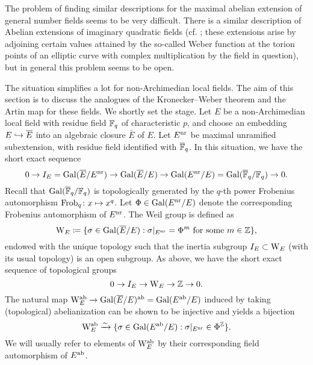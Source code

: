 \documentclass[../main.tex]{subfiles}
\begin{document}
The problem of finding similar descriptions for the maximal abelian extension of
general number fields seems to be very difficult. There is a similar description 
of Abelian extensions of imaginary quadratic fields (cf. \cite[Chapter II,
§5]{silverman1994advanced}; these extensions arise by adjoining certain values attained
by the so-called Weber function at the torion points of an elliptic curve with complex
multiplication by the field in question), but in general this problem seems to be open.

The situation simplifies a lot for non-Archimedian local fields. 
The aim of this section is to discuss the analogues of the 
Kronecker--Weber theorem and the Artin map for these fields. We shortly set the
stage. Let $E$ be a non-Archimedian local field with residue field $\mathbb{F}_q$ of
characteristic $p$, and choose an embedding $E \hookrightarrow \overline E$ into an algebraic
closure $\bar E$ of $E$. Let $E^{\mathrm{nr}}$ be maximal unramified subextension, with
residue field identified with ${\overline {\mathbb{F}}_q}$.
In this situation, we have the short exact sequence
\begin{equation*}
  0 \to I_E = \operatorname{Gal}(\overline E/ E^{\mathrm{nr}}) \to \operatorname{Gal}(\overline E/E) \to \operatorname{Gal}(E^{\mathrm{nr}} /E) =
  \operatorname{Gal}(\overline {\mathbb{F}}_q /\mathbb{F}_q) \to 0.
\end{equation*}
Recall that $\operatorname{Gal}({\overline {\mathbb{F}}_q}/\mathbb{F}_q)$ is topologically generated by the $q$-th power
Frobenius automorphism $\mathrm{Frob}_q\colon x \mapsto x^q$. Let $\Phi \in \operatorname{Gal}(E^{\mathrm{nr}} /E)$ 
denote the corresponding Frobenius automorphism of $E^{\mathrm{nr}}$. 
The Weil group is defined as
\begin{equation*}
  \mathrm W_E \coloneq \{\sigma \in \operatorname{Gal}(\overline E/E) : \sigma|_{E^{\mathrm{nr}}} = \Phi^m
  \text{ for some } m \in \mathbb{Z}\},
\end{equation*}
endowed with the unique topology such that the inertia subgroup $I_E \subset
\mathrm W_E$ (with its usual topology) is an open subgroup.
As above, we have the short exact sequence of topological groups
\begin{equation*}
  0 \to I_E \to \mathrm W_E \to \mathbb{Z} \to 0.
\end{equation*}
The natural map $\mathrm W_E^{\mathrm{ab}} \to \operatorname{Gal}(\overline E/E)^{\mathrm{ab}} = \operatorname{Gal}(E^{\mathrm{ab}}/E)$ induced by taking
(topological) abelianization can be shown to be injective and yields a bijection
\begin{equation}\label{eq:WeilgroupInjectsIntoGalois}
  \mathrm W_E^{\mathrm{ab}} \xrightarrow{\sim} \{\sigma \in \operatorname{Gal}(E^{\mathrm{ab}}/E) : \sigma|_{E^{\mathrm{nr}}} \in \Phi^{\mathbb{Z}}\}.
\end{equation}
We will usually refer to elements of $\mathrm W_E^{\mathrm{ab}}$ by their corresponding field
automorphism of $E^{\mathrm{ab}}$. 
\end{document}
